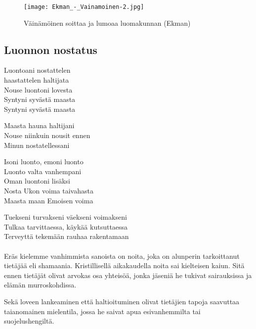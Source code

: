 
\begin{figure}[!ht]
  \caption{Väinämöinen soittaa ja lumoaa luomakunnan (Ekman)}
  \centering
  \texttt{[image: Ekman\_-\_Vainamoinen-2.jpg]}
\end{figure}  

\clearpage
\subsection{Luonnon nostatus}

  \begin{center}
    Luontoani nostattelen \\
    haastattelen haltijata \\
    Nouse luontoni lovesta \\
    Syntyni syvästä maasta \\
    Syntyni syvästä maasta \\
    \end{center}
  \begin{center}
    Maasta hauna haltijani \\
    Nouse niinkuin nousit ennen \\
    Minun nostatellessani \\
  \end{center}
  \begin{center}
    Isoni luonto, emoni luonto \\
    Luonto valta vanhempani \\
    Oman luontoni lisäksi \\
    Nosta Ukon voima taivahasta \\
    Maasta maan Emoisen voima \\
  \end{center}
  \begin{center}
    Tuekseni turvakseni väekseni voimakseni \\
    Tulkaa tarvittaessa, käykää kutsuttaessa \\
    Terveyttä tekemään rauhaa rakentamaan \\  
  \end{center}

  \paragraph{}
  \begin{em}    
    Eräs kielemme vanhimmista sanoista on noita, joka on alunperin tarkoittanut tietäjää eli 
    shamaania. Kristillisellä aikakaudella noita sai kielteisen kaiun. Sitä ennen tietäjät 
    olivat arvokas osa yhteisöä, jonka jäseniä he tukivat sairauksissa ja elämän murroskohdissa.       
      
    Sekä loveen lankeaminen että haltioituminen olivat tietäjien tapoja saavuttaa taianomainen 
    mielentila, jossa he saivat apua esivanhemmilta tai suojelushengiltä.    
  \end{em}
 

